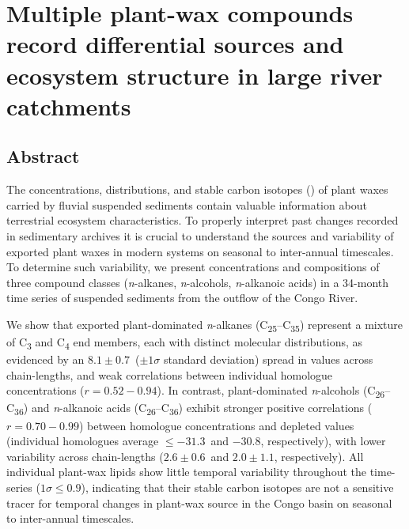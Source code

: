 \chapter{Multiple plant-wax compounds record differential sources and ecosystem structure in large river catchments}
\label{Ch4}
\raggedbottom

{\let\thefootnote\relax{}}

\clearpage

\section{Abstract}

The concentrations, distributions, and stable carbon isotopes () of plant waxes carried by fluvial suspended sediments contain valuable information about terrestrial ecosystem characteristics. To properly interpret past changes recorded in sedimentary archives it is crucial to understand the sources and variability of exported plant waxes in modern systems on seasonal to inter-annual timescales. To determine such variability, we present concentrations and  compositions of three compound classes (\textit{n}-alkanes, \textit{n}-alcohols, \textit{n}-alkanoic acids) in a 34-month time series of suspended sediments from the outflow of the Congo River.

We show that exported plant-dominated \textit{n}-alkanes (C\textsubscript{25}--C\textsubscript{35}) represent a mixture of C\textsubscript{3} and C\textsubscript{4} end members, each with distinct molecular distributions, as evidenced by an $8.1 \pm  0.7$\textperthousand\ ($\pm1\sigma$ standard deviation) spread in  values across chain-lengths, and weak correlations between individual homologue concentrations ($r = 0.52 - 0.94$). In contrast, plant-dominated \textit{n}-alcohols (C\textsubscript{26}--C\textsubscript{36}) and \textit{n}-alkanoic acids (C\textsubscript{26}--C\textsubscript{36}) exhibit stronger positive correlations ($r = 0.70 - 0.99$) between homologue concentrations and depleted  values (individual homologues average $\leq -31.3$\textperthousand\ and $ -30.8$\textperthousand, respectively), with lower  variability across chain-lengths ($2.6 \pm 0.6$\textperthousand\ and $2.0 \pm 1.1$\textperthousand, respectively). All individual plant-wax lipids show little temporal  variability throughout the time-series ($1\sigma \leq 0.9$\textperthousand), indicating that their stable carbon isotopes are not a sensitive tracer for temporal changes in plant-wax source in the Congo basin on seasonal to inter-annual timescales.

